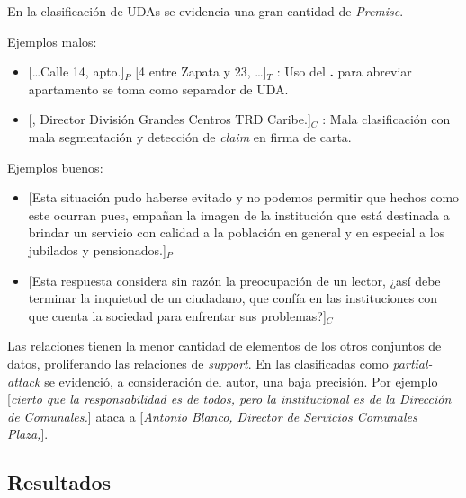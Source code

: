 \documentclass[a4paper,11pt,twocolumn,twoside]{article}
\begin{document}
En la clasificación de UDAs se evidencia una gran cantidad de \textit{Premise}.

Ejemplos malos:
\begin{itemize}
	\item \text{} [\dots Calle 14, apto.]$_P$ [4 entre Zapata y 23, \dots]$_T$
	      : Uso del \textbf{.} para abreviar apartamento se toma como separador de UDA. %
	\item \text{} [, Director División Grandes Centros TRD Caribe.]$_C$
	      : Mala clasificación con mala segmentación y detección de \textit{claim} en firma de carta. 
\end{itemize}

Ejemplos buenos:
\begin{itemize}
	\item \text{} [Esta situación pudo haberse evitado y no podemos permitir que hechos como este ocurran pues,
		      empañan la imagen de la institución que está destinada a brindar un servicio con calidad a la población en 
		      general y en especial a los jubilados y pensionados.]$_P$ %
	\item \text{} [Esta respuesta considera sin razón la preocupación de un lector,
		      ¿así debe terminar la inquietud de un ciudadano, que confía en las instituciones con que cuenta la 
		      sociedad para enfrentar sus problemas?]$_C$ %
\end{itemize}

Las relaciones tienen la menor cantidad de elementos de los otros conjuntos de datos, proliferando
las relaciones de \textit{support}. En las clasificadas como \textit{partial-attack} se evidenció, a 
consideración del autor, una baja precisión. Por ejemplo 
	[\textit{cierto que la responsabilidad es de todos, pero la institucional es de la Dirección de Comunales.}]
ataca a [\textit{Antonio Blanco, Director de Servicios Comunales Plaza,}].

\subsection{Resultados}
\end{document}
